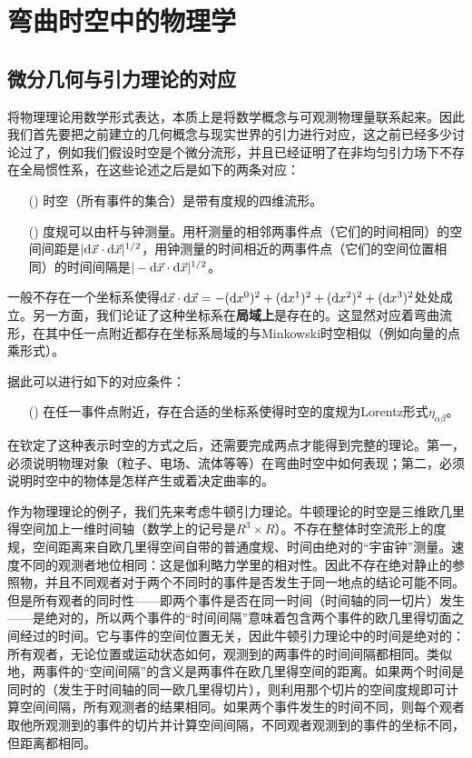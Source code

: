 \chapter{弯曲时空中的物理学}
\label{chap7}

\section{微分几何与引力理论的对应}
\label{sec7.1}
将物理理论用数学形式表达，本质上是将数学概念与可观测物理量联系起来。因此我们首先要把之前建立的几何概念与现实世界的引力进行对应，这之前已经多少讨论过了，例如我们假设时空是个微分流形，并且已经证明了在非均匀引力场下不存在全局惯性系，在这些论述之后是如下的两条对应：

\begin{shaded}
\begin{enumerate}
    \item[(\uppercase\expandafter{\romannumeral1})] 时空（所有事件的集合）是带有度规的四维流形。
    \item[(\uppercase\expandafter{\romannumeral2})] 度规可以由杆与钟测量。用杆测量的相邻两事件点（它们的时间相同）的空间间距是$|\mathrm{d} \vec{x} \cdot \mathrm{d} \vec{x}|^{1/2}$，用钟测量的时间相近的两事件点（它们的空间位置相同）的时间间隔是$|-\mathrm{d} \vec{x} \cdot \mathrm{d} \vec{x}|^{1/2}$。
\end{enumerate}
\end{shaded}
一般不存在一个坐标系使得$\mathrm{d} \vec{x} \cdot \mathrm{d} \vec{x} = -(\mathrm{d} x^0)^2 + (\mathrm{d} x^1)^2 + (\mathrm{d} x^2)^2 + (\mathrm{d} x^3)^2$处处成立。另一方面，我们论证了这种坐标系在\textbf{局域上}是存在的。这显然对应着弯曲流形，在其中任一点附近都存在坐标系局域的与Minkowski时空相似（例如向量的点乘形式）。

据此可以进行如下的对应条件：
\begin{shaded}
\begin{enumerate}
    \item[(\uppercase\expandafter{\romannumeral3})] 在任一事件点附近，存在合适的坐标系使得时空的度规为Lorentz形式$\eta_{\alpha \beta}$。
\end{enumerate}
\end{shaded}
在钦定了这种表示时空的方式之后，还需要完成两点才能得到完整的理论。第一，必须说明物理对象（粒子、电场、流体等等）在弯曲时空中如何表现；第二，必须说明时空中的物体是怎样产生或着决定曲率的。

作为物理理论的例子，我们先来考虑牛顿引力理论。牛顿理论的时空是三维欧几里得空间加上一维时间轴（数学上的记号是$R^3 \times R$）。不存在整体时空流形上的度规，空间距离来自欧几里得空间自带的普通度规、时间由绝对的“宇宙钟”测量。速度不同的观测者地位相同：这是伽利略力学里的相对性。因此不存在绝对静止的参照物，并且不同观者对于两个不同时的事件是否发生于同一地点的结论可能不同。但是所有观者的同时性——即两个事件是否在同一时间（时间轴的同一切片）发生——是绝对的，所以两个事件的“时间间隔”意味着包含两个事件的欧几里得切面之间经过的时间。它与事件的空间位置无关，因此牛顿引力理论中的时间是绝对的：所有观者，无论位置或运动状态如何，观测到的两事件的时间间隔都相同。类似地，两事件的“空间间隔”的含义是两事件在欧几里得空间的距离。如果两个时间是同时的（发生于时间轴的同一欧几里得切片），则利用那个切片的空间度规即可计算空间间隔，所有观测者的结果相同。如果两个事件发生的时间不同，则每个观者取他所观测到的事件的切片并计算空间间隔，不同观者观测到的事件的坐标不同，但距离都相同。

